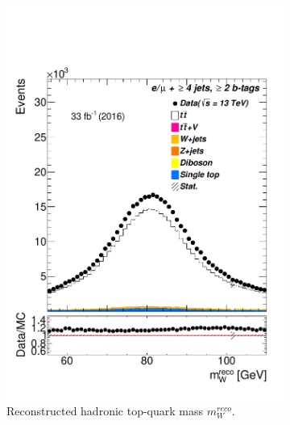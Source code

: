 \begin{figure}
\begin{subfigure}{0.25\textwidth}
		\includegraphics[width=\linewidth]{ControlPlots_emujets_2016_4incl_2incl/klf_window_mw_reco_emujets_2016.pdf}
		\caption{Reconstructed hadronic top-quark mass $m_{W}^{reco}$.} \label{fig:K4}
	\end{subfigure}	\hspace*{0.5cm}	
	\begin{subfigure}{0.25\textwidth}

\end{subfigure}
\end{figure}
